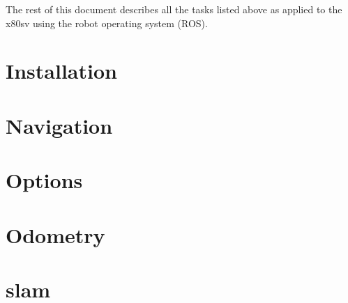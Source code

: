 \documentclass[a4paper]{article}
\begin{document}
The rest of this document describes all the tasks listed above as applied to the x80sv using the robot operating system (ROS).

\section{Installation}


\section{Navigation}

\section{Options}

\section{Odometry}

\section{slam}
\end{document}
